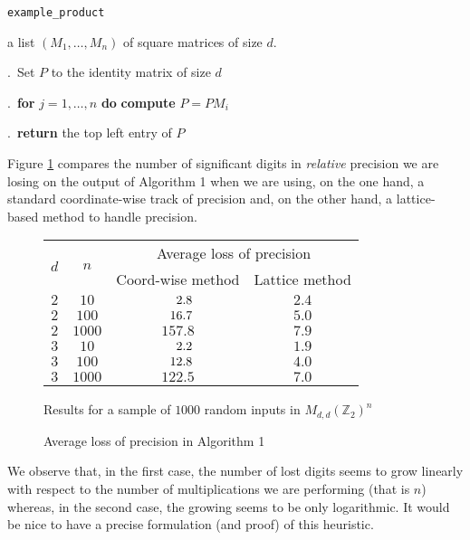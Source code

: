 \documentclass{sig-alternate}
\newcommand{\Z}{\mathbb Z}
\begin{document}
\noindent\hrulefill

 {\tt example\_product}

 a list $(M_1, \ldots, M_n)$ of square matrices
of size $d$.

\smallskip

.\ Set $P$ to the identity matrix of size $d$

.\ {\bf for} $j=1,\dots,n$ {\bf do} {\bf compute} $P = P M_i$

.\ {\bf return} the top left entry of $P$

\vspace{-1ex}\noindent\hrulefill

\medskip

\noindent
Figure \ref{fig:mulmatrix} compares the number of significant digits in 
\emph{relative} precision we are losing on the output of Algorithm 1 
when we are using, on the one hand, a standard coordinate-wise track of 
precision and, on the other hand, a lattice-based method to handle 
precision.
%
\begin{figure}
\begin{center}
\renewcommand{\arraystretch}{1.2}
\begin{tabular}{|c|c|c|c|}
\hline
\multirow{2}{*}{\hspace{0.2cm}$d$\hspace{0.2cm}} & 
\multirow{2}{*}{\hspace{0.2cm}$n$\hspace{0.2cm}} & 
\multicolumn{2}{|c|}{Average loss of precision} \\
\cline{3-4}
& & Coord-wise method & Lattice method \\
\hline 
$2$ & $10$ & $\hphantom{00}2.8$ & $2.4$ \\
$2$ & $100$ & $\hphantom{0}16.7$ & $5.0$ \\
$2$ & $1000$ & $157.8$ & $7.9$ \\
\hline
$3$ & $10$ & $\hphantom{00}2.2$ & $1.9$ \\
$3$ & $100$ & $\hphantom{0}12.8$ & $4.0$ \\
$3$ & $1000$ & $122.5$ & $7.0$ \\
\hline
\end{tabular}

\smallskip

{\small
Results for a sample of $1000$ random inputs in $M_{d,d}(\Z_2)^n$}
\end{center}
\renewcommand{\arraystretch}{1}

\vspace{-0.3cm}

\caption{Average loss of precision in Algorithm 1}
\label{fig:mulmatrix}
\end{figure}
%
We observe that, in the first case, the number of lost digits seems to 
grow linearly with respect to the number of multiplications we are 
performing (that is $n$) whereas, in the second case, the growing seems 
to be only logarithmic. It would be nice to have a precise formulation 
(and proof) of this heuristic.
\end{document}
